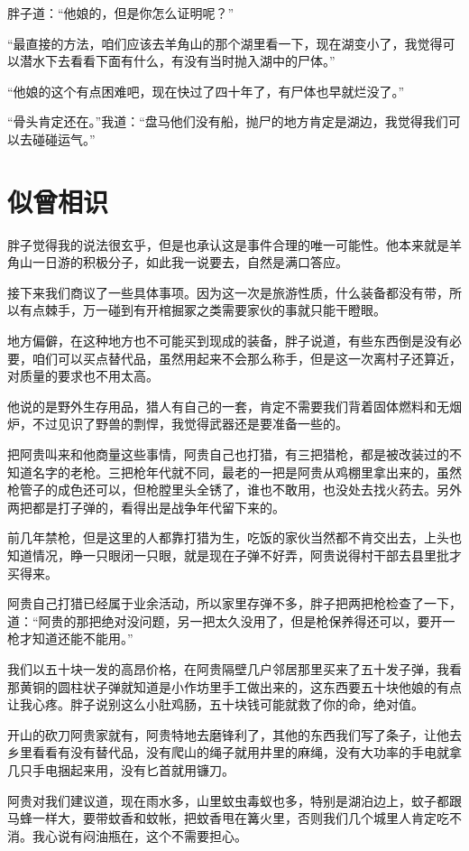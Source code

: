 胖子道：“他娘的，但是你怎么证明呢？”

“最直接的方法，咱们应该去羊角山的那个湖里看一下，现在湖变小了，我觉得可以潜水下去看看下面有什么，有没有当时抛入湖中的尸体。”

“他娘的这个有点困难吧，现在快过了四十年了，有尸体也早就烂没了。”

“骨头肯定还在。”我道：“盘马他们没有船，抛尸的地方肯定是湖边，我觉得我们可以去碰碰运气。”

\chapter{似曾相识}

胖子觉得我的说法很玄乎，但是也承认这是事件合理的唯一可能性。他本来就是羊角山一日游的积极分子，如此我一说要去，自然是满口答应。

接下来我们商议了一些具体事项。因为这一次是旅游性质，什么装备都没有带，所以有点棘手，万一碰到有开棺掘冢之类需要家伙的事就只能干瞪眼。

地方偏僻，在这种地方也不可能买到现成的装备，胖子说道，有些东西倒是没有必要，咱们可以买点替代品，虽然用起来不会那么称手，但是这一次离村子还算近，对质量的要求也不用太高。

他说的是野外生存用品，猎人有自己的一套，肯定不需要我们背着固体燃料和无烟炉，不过见识了野兽的剽悍，我觉得武器还是要准备一些的。

把阿贵叫来和他商量这些事情，阿贵自己也打猎，有三把猎枪，都是被改装过的不知道名字的老枪。三把枪年代就不同，最老的一把是阿贵从鸡棚里拿出来的，虽然枪管子的成色还可以，但枪膛里头全锈了，谁也不敢用，也没处去找火药去。另外两把都是打子弹的，看得出是战争年代留下来的。

前几年禁枪，但是这里的人都靠打猎为生，吃饭的家伙当然都不肯交出去，上头也知道情况，睁一只眼闭一只眼，就是现在子弹不好弄，阿贵说得村干部去县里批才买得来。

阿贵自己打猎已经属于业余活动，所以家里存弹不多，胖子把两把枪检查了一下，道：“阿贵的那把绝对没问题，另一把太久没用了，但是枪保养得还可以，要开一枪才知道还能不能用。”

我们以五十块一发的高昂价格，在阿贵隔壁几户邻居那里买来了五十发子弹，我看那黄铜的圆柱状子弹就知道是小作坊里手工做出来的，这东西要五十块他娘的有点让我心疼。胖子说别这么小肚鸡肠，五十块钱可能就救了你的命，绝对值。

开山的砍刀阿贵家就有，阿贵特地去磨锋利了，其他的东西我们写了条子，让他去乡里看看有没有替代品，没有爬山的绳子就用井里的麻绳，没有大功率的手电就拿几只手电捆起来用，没有匕首就用镰刀。

阿贵对我们建议道，现在雨水多，山里蚊虫毒蚁也多，特别是湖泊边上，蚊子都跟马蜂一样大，要带蚊香和蚊帐，把蚊香甩在篝火里，否则我们几个城里人肯定吃不消。我心说有闷油瓶在，这个不需要担心。

